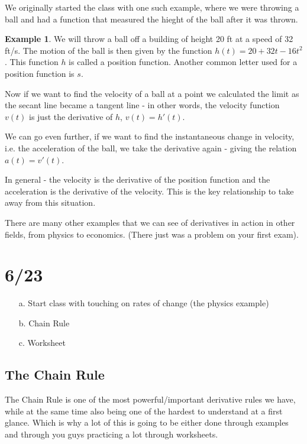 \documentclass[12pt,reqno]{article}
\theoremstyle{definition}
\newtheorem*{Example}{Example}
\begin{document}
We originally started the class with one such example, where we were throwing a ball and had a function that measured the hieght of the ball after it was thrown. 
\begin{Example}
	We will throw a ball off a building of height 20 ft at a speed of 32 ft/s. The motion of the ball is then given by the function $h(t) = 20 + 32t - 16t^2$. This function $h$ is called a position function. Another common letter used for a position function is $s$. 
	
	Now if we want to find the velocity of a ball at a point we calculated the limit as the secant line became a tangent line - in other words, the velocity function $v(t)$ is just the derivative of $h$, $v(t) = h'(t)$. 
	
	We can go even further, if we want to find the instantaneous change in velocity, i.e. the acceleration of the ball, we take the derivative again - giving the relation $a(t) = v'(t)$. 
	
	In general - the velocity is the derivative of the position function and the acceleration is the derivative of the velocity. This is the key relationship to take away from this situation. 
\end{Example}

There are many other examples that we can see of derivatives in action in other fields, from physics to economics. (There just was a problem on your first exam). 

\section{6/23}

\begin{enumerate}
	\item[a.] Start class with touching on rates of change (the physics example)
	\item[b.] Chain Rule
	\item[c.] Worksheet
\end{enumerate}

\subsection{The Chain Rule}

The Chain Rule is one of the most powerful/important derivative rules we have, while at the same time also being one of the hardest to understand at a first glance. Which is why a lot of this is going to be either done through examples and through you guys practicing a lot through worksheets. 
\end{document}
